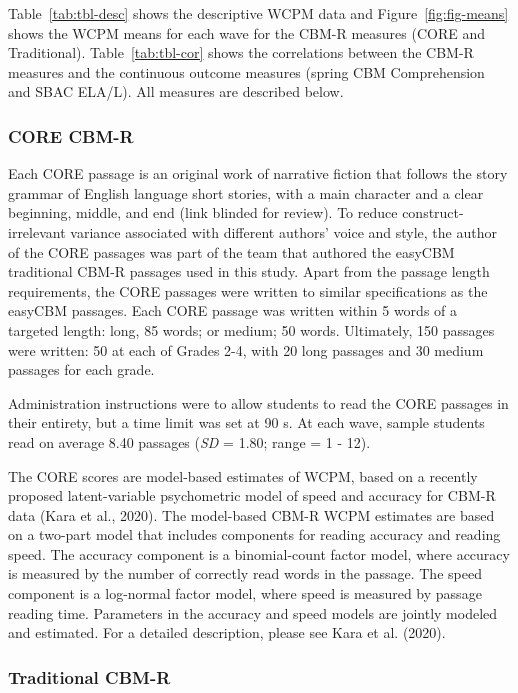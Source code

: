 \documentclass[
  english,
  man, fleqn, noextraspace]{apa6}
\begin{document}
Table~\ref{tab:tbl-desc} shows the descriptive WCPM data and Figure~\ref{fig:fig-means} shows the WCPM means for each wave for the CBM-R measures (CORE and Traditional). Table~\ref{tab:tbl-cor} shows the correlations between the CBM-R measures and the continuous outcome measures (spring CBM Comprehension and SBAC ELA/L). All measures are described below.

\hypertarget{core-cbm-r}{%
\subsubsection{CORE CBM-R}\label{core-cbm-r}}

Each CORE passage is an original work of narrative fiction that follows the story grammar of English language short stories, with a main character and a clear beginning, middle, and end (link blinded for review). To reduce construct-irrelevant variance associated with different authors' voice and style, the author of the CORE passages was part of the team that authored the easyCBM traditional CBM-R passages used in this study. Apart from the passage length requirements, the CORE passages were written to similar specifications as the easyCBM passages. Each CORE passage was written within 5 words of a targeted length: long, 85 words; or medium; 50 words. Ultimately, 150 passages were written: 50 at each of Grades 2-4, with 20 long passages and 30 medium passages for each grade.

Administration instructions were to allow students to read the CORE passages in their entirety, but a time limit was set at 90 s. At each wave, sample students read on average 8.40 passages (\emph{SD} = 1.80; range = 1 - 12).

The CORE scores are model-based estimates of WCPM, based on a recently proposed latent-variable psychometric model of speed and accuracy for CBM-R data (Kara et al., 2020). The model-based CBM-R WCPM estimates are based on a two-part model that includes components for reading accuracy and reading speed. The accuracy component is a binomial-count factor model, where accuracy is measured by the number of correctly read words in the passage. The speed component is a log-normal factor model, where speed is measured by passage reading time. Parameters in the accuracy and speed models are jointly modeled and estimated. For a detailed description, please see Kara et al. (2020).

\hypertarget{traditional-cbm-r}{%
\subsubsection{Traditional CBM-R}\label{traditional-cbm-r}}
\end{document}
